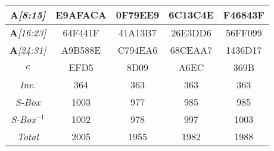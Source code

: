 \begin{sidewaystable}
\begin{center}
\begin{tabular}{|c||c|c|c|c|}
\emph{$\mathbf{A}$[8:15]} &   E9AFACA &  0F79EE9 &  6C13C4E &  F46843F \\ \hline
\emph{$\mathbf{A}$[16:23]} &  64F441F &  41A13B7 &  26E3DD6 &  56FF099 \\ \hline
\emph{$\mathbf{A}$[24:31]} &  A9B588E &  C794EA6 &  68CEAA7 &  1436D17 \\ \hline
\emph{$c$} &   EFD5 &  8D09 &  A6EC &  369B \\ \hline
\emph{Inv.} &  364 &  363 &  363 &  363 \\ \hline
\emph{S-Box} &   1003 &  977 &  985 &  985 \\ \hline 
\emph{S-Box$^{-1}$} &   1002 &  978 &  997 &  1003\\ \hline
\emph{Total} &   2005 &  1955 &  1982 &  1988 \\ \hline
    \end{tabular}
\end{center}
\end{sidewaystable}



